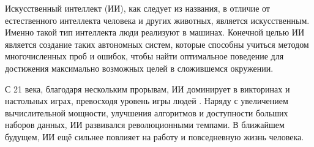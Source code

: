 Искусственный интеллект \cite{Crevier93} (ИИ), как следует из названия, в отличие от естественного интеллекта человека и других животных, является искусственным. Именно такой тип интеллекта люди реализуют в машинах.
Конечной целью ИИ является создание таких автономных систем, которые способны учиться методом многочисленных проб и ошибок, чтобы найти оптимальное поведение для достижения максимально возможных целей в сложившемся окружении. \cite{RussellAndNorvig-AI-modern-approach}

С 21 века, благодаря нескольким прорывам, ИИ доминирует в викторинах и настольных играх, превосходя уровень игры людей \cite{Watson} \cite{AlphaGo}. Наряду с увеличением вычислительной мощности, улучшения алгоритмов и доступности больших наборов данных, ИИ развивался революционными темпами. В ближайшем будущем, ИИ ещё сильнее повлияет на работу и повседневную жизнь человека.





%
\newpage %
